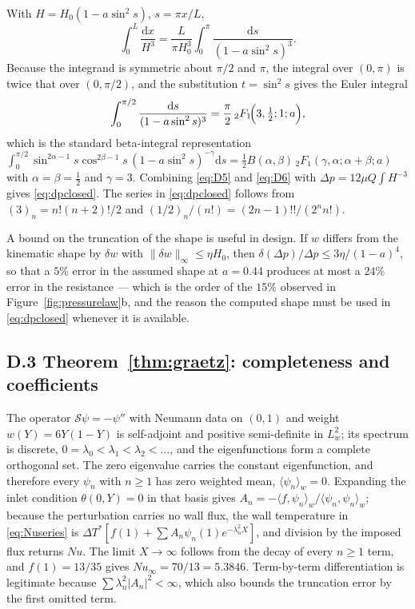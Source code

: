 \documentclass[11pt,a4paper]{article}
\newcommand{\dd}{\mathrm{d}}
\begin{document}
With $H=H_0(1-a\sin^2s)$, $s=\pi x/L$,
\begin{equation}
\int_0^L\frac{\dd x}{H^3}=\frac{L}{\pi H_0^3}\int_0^\pi
\frac{\dd s}{(1-a\sin^2s)^3}.
\label{eq:D5}
\end{equation}
Because the integrand is symmetric about $\pi/2$ and $\pi$, the integral over $(0,\pi)$ is
twice that over $(0,\pi/2)$, and the substitution $t=\sin^2s$ gives the Euler integral
\begin{equation}
\int_0^{\pi/2}\frac{\dd s}{(1-a\sin^2s)^3}
=\frac{\pi}{2}\,{}_2F_1\!\Bigl(3,\tfrac12;1;a\Bigr),
\label{eq:D6}
\end{equation}
which is the standard beta-integral representation
$\int_0^{\pi/2}\sin^{2\alpha-1}s\cos^{2\beta-1}s\,(1-a\sin^2s)^{-\gamma}\dd s
=\tfrac12B(\alpha,\beta)\,{}_2F_1(\gamma,\alpha;\alpha+\beta;a)$ with $\alpha=\beta=\tfrac12$
and $\gamma=3$. Combining \eqref{eq:D5} and \eqref{eq:D6} with $\Delta p=12\mu Q\int H^{-3}$
gives \eqref{eq:dpclosed}. The series in \eqref{eq:dpclosed} follows from
$(3)_n=n!(n+2)!/2$ and $(1/2)_n/(n!)=(2n-1)!!/(2^n n!)$.

A bound on the truncation of the shape is useful in design. If $w$ differs from the kinematic
shape by $\delta w$ with $\|\delta w\|_\infty\le\eta H_0$, then
$\delta(\Delta p)/\Delta p\le3\eta/(1-a)^{4}$, so that a $5\%$ error in the assumed shape at
$a=0.44$ produces at most a $24\%$ error in the resistance --- which is the order of the
$15\%$ observed in Figure~\ref{fig:pressurelaw}b, and the reason the computed shape must be
used in \eqref{eq:dpclosed} whenever it is available.

\subsection*{D.3 Theorem~\ref{thm:graetz}: completeness and coefficients}

The operator $\mathcal S\psi=-\psi''$ with Neumann data on $(0,1)$ and weight $w(Y)=6Y(1-Y)$
is self-adjoint and positive semi-definite in $L^2_w$; its spectrum is discrete,
$0=\lambda_0<\lambda_1<\lambda_2<\dots$, and the eigenfunctions form a complete orthogonal set.
The zero eigenvalue carries the constant eigenfunction, and therefore every $\psi_n$ with
$n\ge1$ has zero weighted mean, $\langle\psi_n\rangle_w=0$. Expanding the inlet condition
$\theta(0,Y)=0$ in that basis gives $A_n=-\langle f,\psi_n\rangle_w/\langle\psi_n,\psi_n\rangle_w$;
because the perturbation carries no wall flux, the wall temperature in
\eqref{eq:Nuseries} is $\Delta T^*[f(1)+\sum A_n\psi_n(1)e^{-\lambda_n^2X}]$, and division by
the imposed flux returns $Nu$. The limit $X\to\infty$ follows from the decay of every $n\ge1$
term, and $f(1)=13/35$ gives $Nu_\infty=70/13=5.3846$. Term-by-term differentiation is
legitimate because $\sum\lambda_n^2|A_n|^2<\infty$, which also bounds the truncation error by
the first omitted term.
\end{document}
